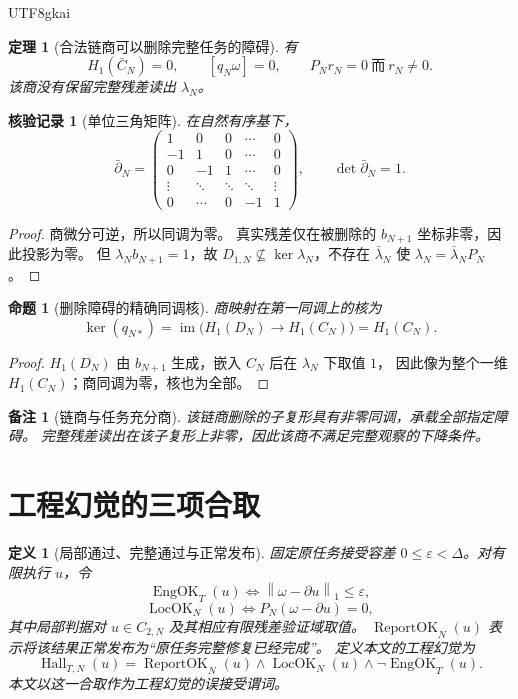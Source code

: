\documentclass[12pt,a4paper,openany]{report}
\newtheorem{definition}{定义}[chapter]
\newtheorem{theorem}{定理}[chapter]
\newtheorem{proposition}{命题}[chapter]
\newtheorem{remark}{备注}[chapter]
\newtheorem{Certificate}{核验记录}[chapter]
\numberwithin{equation}{chapter}
\newcommand{\im}{\operatorname{im}}
\newcommand{\LocOK}{\operatorname{LocOK}}
\newcommand{\EngOK}{\operatorname{EngOK}}
\newcommand{\ReportOK}{\operatorname{ReportOK}}
\newcommand{\Hall}{\operatorname{Hall}}
\newcommand{\Norm}[1]{\left\lVert#1\right\rVert}
\begin{document}
\begin{CJK*}{UTF8}{gkai}
\begin{theorem}[合法链商可以删除完整任务的障碍]
\label{thm:truncation}
有
\[
 H_1(\bar C_N)=0,\qquad
 [q_N\omega]=0,\qquad
 \boxed{P_Nr_N=0\ \text{而}\ r_N\ne0}.
\]
该商没有保留完整残差读出 $\lambda_N$。
\end{theorem}
\begin{Certificate}[单位三角矩阵]
在自然有序基下，
\[
 \bar\partial_N=
 \begin{pmatrix}
 1&0&0&\cdots&0\\
 -1&1&0&\cdots&0\\
 0&-1&1&\cdots&0\\
 \vdots&\ddots&\ddots&\ddots&\vdots\\
 0&\cdots&0&-1&1
 \end{pmatrix},\qquad \det\bar\partial_N=1.
\]
\end{Certificate}
\begin{proof}
商微分可逆，所以同调为零。
真实残差仅在被删除的 $b_{N+1}$ 坐标非零，因此投影为零。
但 $\lambda_Nb_{N+1}=1$，故
$D_{1,N}\not\subseteq\ker\lambda_N$，不存在 $\bar\lambda_N$ 使
$\lambda_N=\bar\lambda_NP_N$。
\end{proof}

\begin{proposition}[删除障碍的精确同调核]
商映射在第一同调上的核为
\[
 \ker(q_{N*})=
 \im\bigl(H_1(D_N)\to H_1(C_N)\bigr)=H_1(C_N).
\]
\end{proposition}
\begin{proof}
$H_1(D_N)$ 由 $b_{N+1}$ 生成，嵌入 $C_N$ 后在 $\lambda_N$ 下取值 $1$，
因此像为整个一维 $H_1(C_N)$；商同调为零，核也为全部。
\end{proof}

\begin{remark}[链商与任务充分商]
该链商删除的子复形具有非零同调，承载全部指定障碍。
完整残差读出在该子复形上非零，因此该商不满足完整观察的下降条件。
\end{remark}

\section{工程幻觉的三项合取}

\begin{definition}[局部通过、完整通过与正常发布]
\label{def:hallucination}
固定原任务接受容差 $0\le\varepsilon<\Delta$。对有限执行 $u$，令
\[
 \EngOK_T(u)\iff\Norm{\omega-\partial u}_1\le\varepsilon,
\]
\[
 \LocOK_N(u)\iff P_N(\omega-\partial u)=0,
\]
其中局部判据对 $u\in C_{2,N}$ 及其相应有限残差验证域取值。
$\ReportOK_N(u)$ 表示将该结果正常发布为“原任务完整修复已经完成”。
定义本文的工程幻觉为
\[
 \boxed{
 \Hall_{T,N}(u)=
 \ReportOK_N(u)\land\LocOK_N(u)\land\neg\EngOK_T(u)}.
\]
本文以这一合取作为工程幻觉的误接受谓词。
\end{definition}


\end{CJK*}
\end{document}
